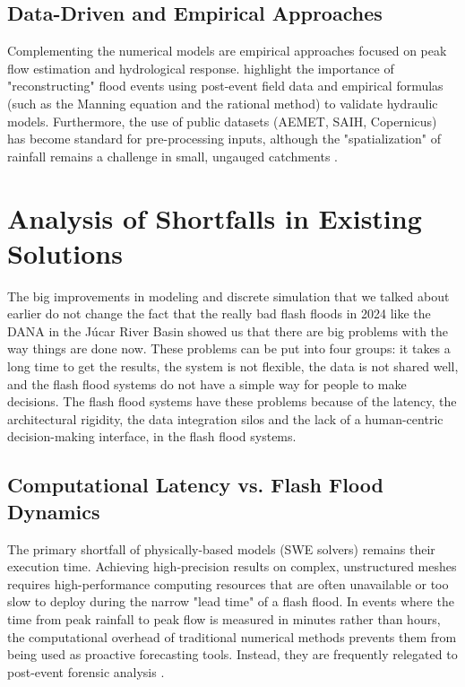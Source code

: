 \subsection{Data-Driven and Empirical Approaches}

Complementing the numerical models are empirical approaches focused on peak flow estimation and hydrological response. 
\cite{Muoz2025} highlight the importance of "reconstructing" flood events using post-event field data and empirical 
formulas (such as the Manning equation and the rational method) to validate hydraulic models. Furthermore, the use of 
public datasets (AEMET, SAIH, Copernicus) has become standard for pre-processing inputs, although the "spatialization" 
of rainfall remains a challenge in small, ungauged catchments \parencite{Vasileva2021}.


\section{Analysis of Shortfalls in Existing Solutions}

The big improvements in modeling and discrete simulation that we talked about earlier do not change the fact that the really bad 
flash floods in 2024 like the DANA in the Júcar River Basin showed us that there are big problems with the way things are done now. 
These problems can be put into four groups: it takes a long time to get the results, the system is not flexible, the data is not shared 
well, and the flash flood systems do not have a simple way for people to make decisions. The flash flood systems have these problems 
because of the latency, the architectural rigidity, the data integration silos and the lack of a human-centric decision-making 
interface, in the flash flood systems.


\subsection{Computational Latency vs. Flash Flood Dynamics}

The primary shortfall of physically-based models (SWE solvers) remains their execution time. Achieving high-precision results on 
complex, unstructured meshes requires high-performance computing resources that are often unavailable or too slow to deploy during 
the narrow "lead time" of a flash flood. In events where the time from peak rainfall to peak flow is measured in minutes rather than 
hours, the computational overhead of traditional numerical methods prevents them from being used as proactive forecasting tools. 
Instead, they are frequently relegated to post-event forensic analysis \parencite{Muoz2025}.


